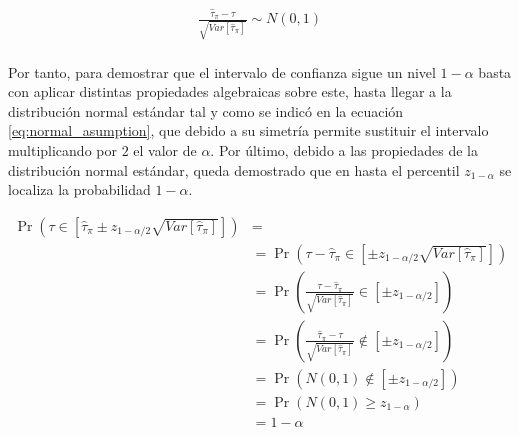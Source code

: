 \documentclass{article}
\begin{document}
      \begin{align}
      \label{eq:normal_asumption}
        \frac{\widehat{\tau}_\pi - \tau}{\sqrt{Var[\widehat{\tau}_\pi]}} \sim N(0,1)
      \end{align}

      \paragraph{}
      Por tanto, para demostrar que el intervalo de confianza sigue un nivel $1-\alpha$ basta con aplicar distintas propiedades algebraicas sobre este, hasta llegar a la distribución normal estándar tal y como se indicó en la ecuación \eqref{eq:normal_asumption}, que debido a su simetría permite sustituir el intervalo multiplicando por $2$ el valor de $\alpha$. Por último, debido a las propiedades de la distribución normal estándar, queda demostrado que en hasta el percentil $z_{1-\alpha}$ se localiza la probabilidad $1-\alpha$.

      \begin{align}
        \Pr\left(\tau\in \left[\widehat{\tau}_\pi \pm z_{1-\alpha/2}\sqrt{Var[\widehat{\tau}_\pi]}\right]\right) &=\\
        &= \Pr\left(\tau - \widehat{\tau}_\pi \in \left[\pm z_{1-\alpha/2}\sqrt{Var[\widehat{\tau}_\pi]}\right]\right) \\
        &= \Pr\left(\frac{\tau - \widehat{\tau}_\pi}{\sqrt{Var[\widehat{\tau}_\pi]}} \in \left[\pm z_{1-\alpha/2}\right]\right)  \\
        &= \Pr\left(\frac{\widehat{\tau}_\pi - \tau}{\sqrt{Var[\widehat{\tau}_\pi]}} \not\in \left[\pm z_{1-\alpha/2}\right]\right)  \\
        &= \Pr\left(N(0,1) \not\in [\pm z_{1-\alpha/2}]\right) \\
        &= \Pr\left(N(0,1) \geq z_{1-\alpha}\right) \\
        &=  1- \alpha
      \end{align}
	\nocite{muest2017}
  \nocite{sarndal2003model}

  
  
\end{document}
